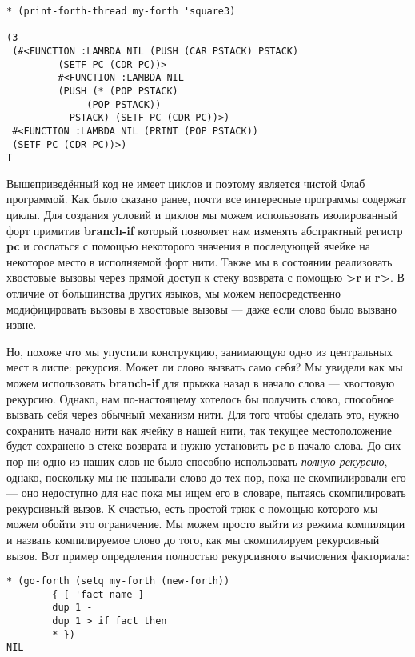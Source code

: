 \begin{verbatim}
* (print-forth-thread my-forth 'square3)

(3
 (#<FUNCTION :LAMBDA NIL (PUSH (CAR PSTACK) PSTACK)
	     (SETF PC (CDR PC))>
	     #<FUNCTION :LAMBDA NIL
	     (PUSH (* (POP PSTACK)
		      (POP PSTACK))
		   PSTACK) (SETF PC (CDR PC))>)
 #<FUNCTION :LAMBDA NIL (PRINT (POP PSTACK))
 (SETF PC (CDR PC))>) 
T
\end{verbatim}

Вышеприведённый код не имеет циклов и поэтому является чистой Флаб программой. Как было сказано ранее, почти все интересные программы содержат циклы. Для создания условий и циклов мы можем использовать изолированный форт примитив \textbf{branch-if} который позволяет нам изменять абстрактный регистр \textbf{pc} и сослаться с помощью некоторого значения в последующей ячейке на некоторое место в исполняемой форт нити. Также мы в состоянии реализовать хвостовые вызовы через прямой доступ к стеку возврата с помощью \textbf{>r} и \textbf{r>}. В отличие от большинства других языков, мы можем непосредственно модифицировать вызовы в хвостовые вызовы --- даже если слово было вызвано извне.

Но, похоже что мы упустили конструкцию, занимающую одно из центральных мест в лиспе: рекурсия. Может ли слово вызвать само себя? Мы увидели как мы можем использовать \textbf{branch-if} для прыжка назад в начало слова --- хвостовую рекурсию. Однако, нам по-настоящему хотелось бы получить слово, способное вызвать себя через обычный механизм нити. Для того чтобы сделать это, нужно сохранить начало нити как ячейку в нашей нити, так текущее местоположение будет сохранено в стеке возврата и нужно установить \textbf{pc} в начало слова. До сих пор ни одно из наших слов не было способно использовать \emph{полную рекурсию}, однако, поскольку мы не называли слово до тех пор, пока не скомпилировали его --- оно недоступно для нас пока мы ищем его в словаре, пытаясь скомпилировать рекурсивный вызов. К счастью, есть простой трюк с помощью которого мы можем обойти это ограничение. Мы можем просто выйти из режима компиляции и назвать компилируемое слово до того, как мы скомпилируем рекурсивный вызов. Вот пример определения полностью рекурсивного вычисления факториала:

\begin{verbatim}
* (go-forth (setq my-forth (new-forth))
	    { [ 'fact name ]
	    dup 1 -
	    dup 1 > if fact then
	    * })
NIL
\end{verbatim}

